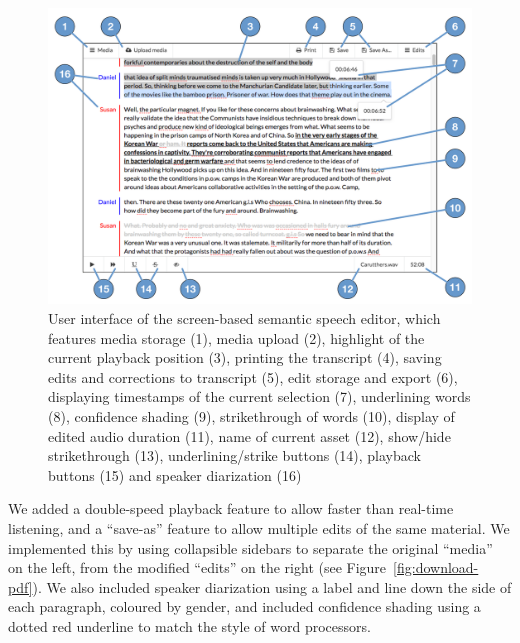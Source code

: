 \begin{figure}
  \centering
  \includegraphics[width=\columnwidth]{figs/discourse-interface-labelled}
  \caption[User interface of the screen-based semantic speech editor.]{User interface of the screen-based semantic
    speech editor, which features 
    media storage (1),
    media upload (2),
    highlight of the current playback position (3),
    printing the transcript (4),
    saving edits and corrections to transcript (5),
    edit storage and export (6),
    displaying timestamps of the current selection (7),
    underlining words (8),
    confidence shading (9),
    strikethrough of words (10),
    display of edited audio duration (11),
    name of current asset (12),
    show/hide strikethrough (13),
    underlining/strike buttons (14),
    playback buttons (15)
  and speaker diarization (16)}
  \label{fig:dialogger-interface}
\end{figure}

We added a double-speed playback feature to allow faster than real-time listening, and a ``save-as'' feature to allow
multiple edits of the same material.  We implemented this by using collapsible sidebars to separate the original
``media'' on the left, from the modified ``edits'' on the right (see Figure~\ref{fig:download-pdf}).  We also included
speaker diarization using a label and line down the side of each paragraph, coloured by gender, and included confidence
shading using a dotted red underline to match the style of word processors.

